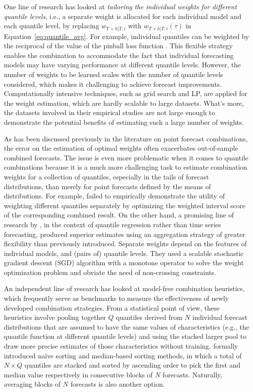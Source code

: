 \documentclass[11pt]{article}
\begin{document}
One line of research has looked at \textit{tailoring the individual weights for different quantile levels}, i.e., a separate weight is allocated for each individual model and each quantile level, by replacing $w_{T+h|T,i}$ with $w_{T+h|T,i}(\tau)$ in Equation~\eqref{eq:quantile_avg}. For example, individual quantiles can be weighted by the reciprocal of the value of the pinball loss function \citep{Wang2019-lx,Zhang2020-dm,Browell2020-pa}.  This flexible strategy enables the combination to accommodate the fact that individual forecasting models may have varying performance at different quantile levels. However, the number of weights to be learned scales with the number of quantile levels considered, which makes it challenging to achieve forecast improvements. Computationally intensive techniques, such as grid search and LP, are applied for the weight estimation, which are hardly scalable to large datasets. What's more, the datasets involved in their empirical studies are not large enough to demonstrate the potential benefits of estimating such a large number of weights. 

As has been discussed previously in the literature on point forecast combinations, the error on the estimation of optimal weights often exacerbates out-of-sample combined forecasts. The issue is even more problematic when it comes to quantile combinations because it is a much more challenging task to estimate combination weights for a collection of quantiles, especially in the tails of forecast distributions, than merely for point forecasts defined by the means of distributions. For example, \citet{Brooks2020-sg} failed to empirically demonstrate the utility of weighting different quantiles separately by optimizing the weighted interval score \citep[WIS,][]{Bracher2021-hx} of the corresponding combined result. On the other hand, a promising line of research by \citet{Kim2021-wa}, in the context of quantile regression rather than time series forecasting, produced superior estimates using an aggregation strategy of greater flexibility than previously introduced. Separate weights depend on the features of individual models, and (pairs of) quantile levels. They used a scalable stochastic gradient descent (SGD) algorithm with a monotone operator to solve the weight optimization problem and obviate the need of non-crossing constraints.

An independent line of research has looked at model-free combination heuristics, which frequently serve as benchmarks to measure the effectiveness of newly developed combination strategies. From a statistical point of view, these heuristics involve pooling together $Q$ quantiles derived from $N$ individual forecast distributions that are assumed to have the same values of characteristics (e.g., the quantile function at different quantile levels) and using the stacked larger pool to draw more precise estimates of those characteristics without training. \citet{Wang2019-lx} formally introduced na\"{i}ve sorting and median-based sorting methods, in which a total of $N \times Q$ quantiles are stacked and sorted by ascending order to pick the first and median value respectively in consecutive blocks of $N$ forecasts. Naturally, averaging blocks of $N$ forecasts is also another option. 
\end{document}
